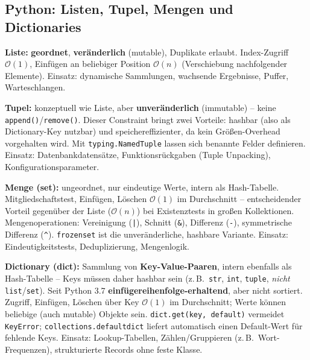 \subsection{Python: Listen, Tupel, Mengen und Dictionaries}


\textbf{Liste:} \textbf{geordnet}, \textbf{veränderlich} (mutable), Duplikate erlaubt. Index-Zugriff $\mathcal{O}(1)$, Einfügen an beliebiger Position $\mathcal{O}(n)$ (Verschiebung nachfolgender Elemente). Einsatz: dynamische Sammlungen, wachsende Ergebnisse, Puffer, Warteschlangen.

\textbf{Tupel:} konzeptuell wie Liste, aber \textbf{unveränderlich} (immutable) -- keine \texttt{append()}/\texttt{remove()}. Dieser Constraint bringt zwei Vorteile: hashbar (also als Dictionary-Key nutzbar) und speichereffizienter, da kein Größen-Overhead vorgehalten wird. Mit \texttt{typing.NamedTuple} lassen sich benannte Felder definieren. Einsatz: Datenbankdatensätze, Funktionsrückgaben (Tuple Unpacking), Konfigurationsparameter.

\textbf{Menge (set):} ungeordnet, nur eindeutige Werte, intern als Hash-Tabelle. Mitgliedschaftstest, Einfügen, Löschen $\mathcal{O}(1)$ im Durchschnitt -- entscheidender Vorteil gegenüber der Liste ($\mathcal{O}(n)$) bei Existenztests in großen Kollektionen. Mengenoperationen: Vereinigung (\texttt{|}), Schnitt (\texttt{\&}), Differenz (\texttt{-}), symmetrische Differenz (\texttt{\textasciicircum}). \texttt{frozenset} ist die unveränderliche, hashbare Variante. Einsatz: Eindeutigkeitstests, Deduplizierung, Mengenlogik.

\textbf{Dictionary (dict):} Sammlung von \textbf{Key-Value-Paaren}, intern ebenfalls als Hash-Tabelle -- Keys müssen daher hashbar sein (z.\,B.\ \texttt{str}, \texttt{int}, \texttt{tuple}, \emph{nicht} \texttt{list}/\texttt{set}). Seit Python 3.7 \textbf{einfügereihenfolge-erhaltend}, aber nicht sortiert. Zugriff, Einfügen, Löschen über Key $\mathcal{O}(1)$ im Durchschnitt; Werte können beliebige (auch mutable) Objekte sein. \texttt{dict.get(key, default)} vermeidet \texttt{KeyError}; \texttt{collections.defaultdict} liefert automatisch einen Default-Wert für fehlende Keys. Einsatz: Lookup-Tabellen, Zählen/Gruppieren (z.\,B.\ Wort-Frequenzen), strukturierte Records ohne feste Klasse.


